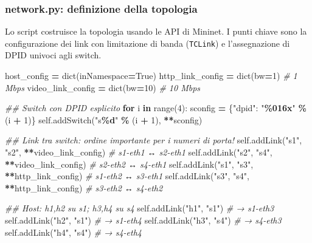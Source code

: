 \documentclass[
  italian,
  openany]{book}
\newenvironment{Shaded}{\begin{snugshade}}{\end{snugshade}}
\newcommand{\BuiltInTok}[1]{#1}
\newcommand{\CommentTok}[1]{\textcolor[rgb]{0.56,0.35,0.01}{\textit{#1}}}
\newcommand{\ControlFlowTok}[1]{\textcolor[rgb]{0.13,0.29,0.53}{\textbf{#1}}}
\newcommand{\DecValTok}[1]{\textcolor[rgb]{0.00,0.00,0.81}{#1}}
\newcommand{\KeywordTok}[1]{\textcolor[rgb]{0.13,0.29,0.53}{\textbf{#1}}}
\newcommand{\NormalTok}[1]{#1}
\newcommand{\OperatorTok}[1]{\textcolor[rgb]{0.81,0.36,0.00}{\textbf{#1}}}
\newcommand{\SpecialCharTok}[1]{\textcolor[rgb]{0.81,0.36,0.00}{\textbf{#1}}}
\newcommand{\StringTok}[1]{\textcolor[rgb]{0.31,0.60,0.02}{#1}}
\newcommand{\VariableTok}[1]{\textcolor[rgb]{0.00,0.00,0.00}{#1}}
\begin{document}
\subsubsection{network.py: definizione della
topologia}\label{network.py-definizione-della-topologia}

Lo script costruisce la topologia usando le API di Mininet. I punti
chiave sono la configurazione dei link con limitazione di banda
(\texttt{TCLink}) e l'assegnazione di DPID univoci agli switch.

\begin{Shaded}
\begin{Highlighting}[]
\NormalTok{host\_config }\OperatorTok{=} \BuiltInTok{dict}\NormalTok{(inNamespace}\OperatorTok{=}\VariableTok{True}\NormalTok{)}
\NormalTok{http\_link\_config }\OperatorTok{=} \BuiltInTok{dict}\NormalTok{(bw}\OperatorTok{=}\DecValTok{1}\NormalTok{)   }\CommentTok{\# 1 Mbps}
\NormalTok{video\_link\_config }\OperatorTok{=} \BuiltInTok{dict}\NormalTok{(bw}\OperatorTok{=}\DecValTok{10}\NormalTok{) }\CommentTok{\# 10 Mbps}

\CommentTok{\#\# Switch con DPID esplicito}
\ControlFlowTok{for}\NormalTok{ i }\KeywordTok{in} \BuiltInTok{range}\NormalTok{(}\DecValTok{4}\NormalTok{):}
\NormalTok{    sconfig }\OperatorTok{=}\NormalTok{ \{}\StringTok{"dpid"}\NormalTok{: }\StringTok{"}\SpecialCharTok{\%016x}\StringTok{"} \OperatorTok{\%}\NormalTok{ (i }\OperatorTok{+} \DecValTok{1}\NormalTok{)\}}
    \VariableTok{self}\NormalTok{.addSwitch(}\StringTok{"s}\SpecialCharTok{\%d}\StringTok{"} \OperatorTok{\%}\NormalTok{ (i }\OperatorTok{+} \DecValTok{1}\NormalTok{), }\OperatorTok{**}\NormalTok{sconfig)}

\CommentTok{\#\# Link tra switch: ordine importante per i numeri di porta!}
\VariableTok{self}\NormalTok{.addLink(}\StringTok{"s1"}\NormalTok{, }\StringTok{"s2"}\NormalTok{, }\OperatorTok{**}\NormalTok{video\_link\_config)  }\CommentTok{\# s1{-}eth1 ↔ s2{-}eth1}
\VariableTok{self}\NormalTok{.addLink(}\StringTok{"s2"}\NormalTok{, }\StringTok{"s4"}\NormalTok{, }\OperatorTok{**}\NormalTok{video\_link\_config)  }\CommentTok{\# s2{-}eth2 ↔ s4{-}eth1}
\VariableTok{self}\NormalTok{.addLink(}\StringTok{"s1"}\NormalTok{, }\StringTok{"s3"}\NormalTok{, }\OperatorTok{**}\NormalTok{http\_link\_config)   }\CommentTok{\# s1{-}eth2 ↔ s3{-}eth1}
\VariableTok{self}\NormalTok{.addLink(}\StringTok{"s3"}\NormalTok{, }\StringTok{"s4"}\NormalTok{, }\OperatorTok{**}\NormalTok{http\_link\_config)   }\CommentTok{\# s3{-}eth2 ↔ s4{-}eth2}

\CommentTok{\#\# Host: h1,h2 su s1; h3,h4 su s4}
\VariableTok{self}\NormalTok{.addLink(}\StringTok{"h1"}\NormalTok{, }\StringTok{"s1"}\NormalTok{)  }\CommentTok{\# → s1{-}eth3}
\VariableTok{self}\NormalTok{.addLink(}\StringTok{"h2"}\NormalTok{, }\StringTok{"s1"}\NormalTok{)  }\CommentTok{\# → s1{-}eth4}
\VariableTok{self}\NormalTok{.addLink(}\StringTok{"h3"}\NormalTok{, }\StringTok{"s4"}\NormalTok{)  }\CommentTok{\# → s4{-}eth3}
\VariableTok{self}\NormalTok{.addLink(}\StringTok{"h4"}\NormalTok{, }\StringTok{"s4"}\NormalTok{)  }\CommentTok{\# → s4{-}eth4}
\end{Highlighting}
\end{Shaded}
\end{document}
